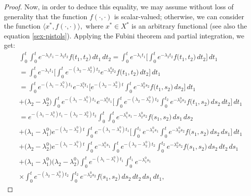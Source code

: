 \documentclass{amsart}
\theoremstyle{definition}
\theoremstyle{remark}
\numberwithin{equation}{section}
\begin{document}
\begin{proof}
Now, in order to deduce this equality, we may assume without loss of generality that the function $f(\cdot,\cdot)$ is scalar-valued; otherwise, we can consider the function $\langle x^{\ast}, f(\cdot,\cdot) \rangle ,$ where $x^{\ast}\in X^{\ast}$ is an arbitrary functional (see also the equation \eqref{sex-pistols}).  
Applying the Fubini theorem and partial integration, we get:
\begin{align*}
&\int^{t}_{0}\int^{t}_{0}e^{-\lambda_{1}t_{1}-\lambda_{2}t_{2}}f\bigl( t_{1},t_{2}\bigr)\, dt_{1}\, dt_{2}=\int^{t}_{0}e^{-\lambda_{1}t_{1}}\Biggl[ \int^{t}_{0}e^{-\lambda_{2}t_{2}}f\bigl( t_{1},t_{2}\bigr)\, dt_{2}\Biggr]\, dt_{1}
\\& =\int^{t}_{0}e^{-\lambda_{1}t_{1}}\Biggl[ \int^{t}_{0}e^{-(\lambda_{2}-\lambda_{2}^{0})t_{2}}e^{-\lambda_{2}^{0}t_{2}}f\bigl( t_{1},t_{2}\bigr)\, dt_{2}\Biggr]\, dt_{1}
\\& =\int^{t}_{0}e^{-(\lambda_{1}-\lambda_{1}^{0})t_{1}}e^{-\lambda_{1}^{0}t_{1}}\Biggl[ e^{-(\lambda_{2}-\lambda_{2}^{0})t}\int^{t}_{0}e^{-\lambda_{2}^{0}s_{2}}f\bigl( t_{1},s_{2}\bigr)\, ds_{2}\Biggr]\, dt_{1}
\\& +\bigl( \lambda_{2}-\lambda_{2}^{0}\bigr)\int^{t}_{0}e^{-(\lambda_{1}-\lambda_{1}^{0})t_{1}}e^{-\lambda_{1}^{0}t_{1}}\Biggl[ \int^{t}_{0}e^{-(\lambda_{2}-\lambda_{2}^{0})t_{2}}\int^{t_{2}}_{0}e^{-\lambda_{2}^{0}s_{2}}f\bigl( t_{1},s_{2}\bigr)\, ds_{2}\, dt_{2}\Biggr]\, dt_{1}
\\& =e^{-(\lambda_{1}-\lambda_{1}^{0})t_{1}-(\lambda_{2}-\lambda_{2}^{0})t_{2}}\int^{t}_{0}\int^{t}_{0}e^{-\lambda_{1}^{0}s_{1}-\lambda_{2}^{0}s_{2}}f\bigl( s_{1},s_{2}\bigr)\, ds_{1}\, ds_{2}
\\& +\bigl( \lambda_{1}-\lambda_{1}^{0}\bigr)e^{-(\lambda_{2}-\lambda_{2}^{0})t}\int^{t}_{0}e^{-(\lambda_{1}-\lambda_{1}^{0})t_{1}}\Biggl[\int^{t_{1}}_{0}e^{-\lambda_{1}^{0}s_{1}}\int^{t}_{0}e^{-\lambda_{2}^{0}s_{2}}f\bigl( s_{1},s_{2}\bigr)\, ds_{2}\, ds_{1}\Biggr] \, dt_{1}
\\& +\bigl( \lambda_{2}-\lambda_{2}^{0}\bigr)e^{-(\lambda_{1}-\lambda_{1}^{0})t}\int^{t}_{0}e^{-\lambda_{1}^{0}s_{1}}\int^{t}_{0}e^{-(\lambda_{2}-\lambda_{2}^{0})t_{2}}\int^{t_{2}}_{0}e^{-\lambda_{2}^{0}s_{2}}    f\bigl( s_{1},s_{2}\bigr)\, ds_{2}\, dt_{2} \, ds_{1}
\\& +\bigl( \lambda_{1}-\lambda_{1}^{0}\bigr)\bigl( \lambda_{2}-\lambda_{2}^{0}\bigr)\int^{t}_{0}e^{-(\lambda_{1}-\lambda_{1}^{0})t_{1}}\int^{t_{1}}_{0}e^{-\lambda_{1}^{0}s_{1}}
\\& \times \int^{t}_{0}e^{-(\lambda_{2}-\lambda_{2}^{0})t_{2}}\int^{t_{2}}_{0}e^{-\lambda_{2}^{0}s_{2}}f\bigl( s_{1},s_{2}\bigr)\, ds_{2}\, dt_{2} \, ds_{1}\, dt_{1},

\end{align*}
\end{proof}
\end{document}
